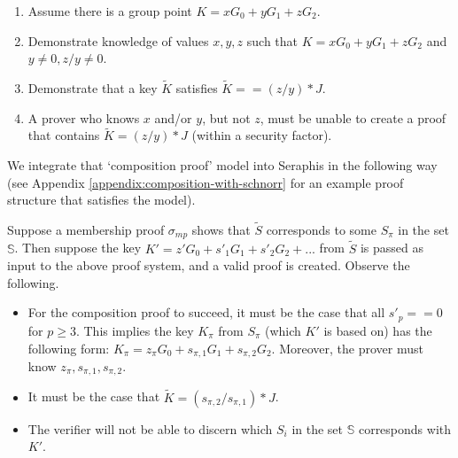 \begin{enumerate}
    \item Assume there is a group point $K = x G_0 + y G_1 + z G_2$.

    \item Demonstrate knowledge of values $x, y, z$ such that $K = x G_0 + y G_1 + z G_2$ and $y \neq 0, z/y \neq 0$.

    \item Demonstrate that a key $\tilde{K}$ satisfies $\tilde{K} == (z/y)*J$.

    \item A prover who knows $x$ and/or $y$, but not $z$, must be unable to create a proof that contains $\tilde{K} = (z/y)*J$ (within a security factor).
\end{enumerate}


We integrate that `composition proof' model into Seraphis in the following way (see Appendix \ref{appendix:composition-with-schnorr} for an example proof structure that satisfies the model).

Suppose a membership proof $\sigma_{mp}$ shows that $\tilde{S}$ corresponds to some $S_{\pi}$ in the set $\mathbb{S}$. Then suppose the key $K' = z' G_0 + s'_1 G_1 + s'_2 G_2 + ...$ from $\tilde{S}$ is passed as input to the above proof system, and a valid proof is created. Observe the following.

\begin{itemize}
    \item For the composition proof to succeed, it must be the case that all $s'_p == 0$ for $p \geq 3$. This implies the key $K_{\pi}$ from $S_{\pi}$ (which $K'$ is based on) has the following form: $K_{\pi} = z_{\pi} G_0 + s_{\pi, 1} G_1 + s_{\pi, 2} G_2$. Moreover, the prover must know $z_{\pi}, s_{\pi, 1}, s_{\pi, 2}$.

    \item It must be the case that $\tilde{K} = (s_{\pi, 2}/ s_{\pi, 1})*J$.

    \item The verifier will not be able to discern which $S_i$ in the set $\mathbb{S}$ corresponds with $K'$.
\end{itemize}

